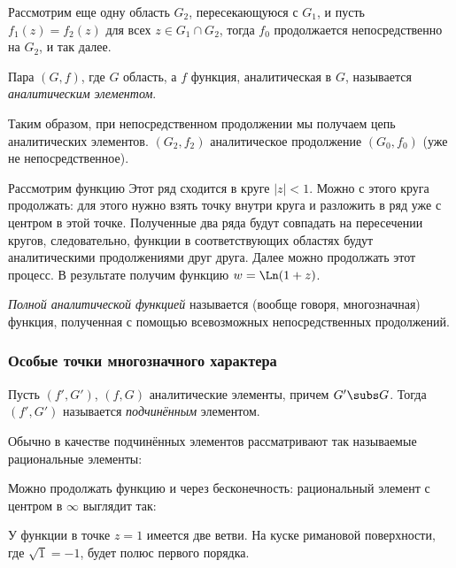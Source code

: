 \documentclass[a4paper]{article}
\begin{document}
\begin{theorem}
Рассмотрим  еще одну область $G_2$, пересекающуюся с $G_1$, и пусть $f_1(z)=f_2(z)$ для всех $z \in G_1\cap G_2$,
тогда $f_0$ продолжается непосредственно на $G_2$, и так далее.

\begin{df}
Пара $(G, f)$, где $G$ область, а $f$ функция, аналитическая в $G$, называется \emph{аналитическим элементом}.
\end{df}

Таким образом, при непосредственном продолжении мы получаем цепь аналитических элементов.
$(G_2, f_2)$ аналитическое продолжение $(G_0, f_0)$ (уже не непосредственное).


\begin{ex}
Рассмотрим функцию 
Этот ряд сходится в круге $|z|<1$. Можно с этого круга продолжать: для этого нужно взять точку внутри круга
и разложить в ряд уже с центром в этой точке. Полученные два ряда будут совпадать на пересечении кругов,
следовательно, функции в соответствующих областях будут аналитическими продолжениями друг друга. Далее можно
продолжать этот процесс. В результате получим функцию $w=\Ln(1+z)$.
\end{ex}

\begin{df}
\emph{Полной аналитической функцией} называется (вообще говоря, многозначная) функция, полученная с помощью всевозможных
непосредственных продолжений.
\end{df}

\subsubsection{Особые точки многозначного характера}

\begin{df} Пусть $(f', G')$, $(f, G)$ аналитические элементы, причем $G' \subs G$. Тогда $(f', G')$
называется \emph{подчинённым} элементом.
\end{df}

Обычно в качестве подчинённых элементов рассматривают так называемые рациональные элементы:

Можно продолжать функцию и через бесконечность: рациональный элемент с центром в $\infty$ выглядит так:

\begin{ex}
У функции
в точке $z=1$ имеется две ветви. На куске римановой поверхности, где $\sqrt{1}=-1$,
будет полюс первого порядка.
\end{ex}


\end{theorem}
\end{document}
